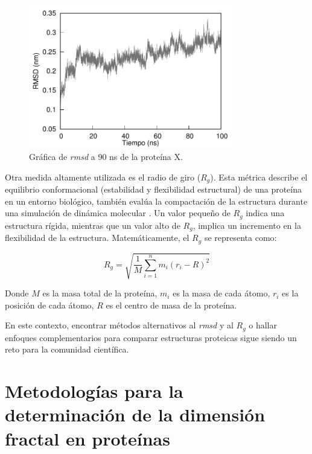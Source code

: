 	\begin{figure}[h!]
		\centering
		\includegraphics[width=0.8\textwidth]{graphs/rmsd.pdf}
	\caption{Gr\'{a}fica de \textit{rmsd} a 90 ns de la prote\'{i}na X.}
	\label{rmsd-graf}
	\end{figure}


Otra medida altamente utilizada es el radio de giro ($R_g$). Esta métrica describe el equilibrio conformacional (estabilidad y flexibilidad estructural) de una proteína en un entorno biológico, también evalúa la compactación de la estructura durante una simulación de dinámica molecular \cite{Saudagar2023}. Un valor pequeño de $R_g$ indica una estructura rígida, mientras que un valor alto de $R_g$, implica un incremento en la flexibilidad de la estructura. Matemáticamente, el $R_g$ se representa como:


\begin{equation}
	R_g = \sqrt{\frac{1}{M} \sum_{i=1}^{n} m_i \left( r_i - R \right)^2 }
	\label{rg}
\end{equation}

Donde $M$ es la masa total de la proteína, $m_i$ es la masa de cada átomo, $r_i$ es la posición de cada átomo, $R$ es el centro de masa de la proteína.

En este contexto, encontrar m\'{e}todos alternativos al \textit{rmsd} y al $R_g$ o hallar enfoques complementarios para comparar estructuras proteicas sigue siendo un reto para la comunidad cient\'{i}ﬁca.


\section{Metodolog\'{i}as para la determinaci\'{o}n de la dimensi\'{o}n fractal en prote\'{i}nas}


